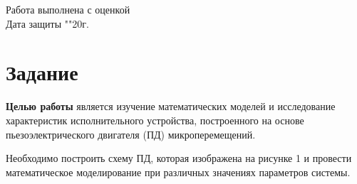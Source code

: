 \documentclass[a4paper, 12pt]{article}
\begin{document}
\begin{titlepage}
	Работа выполнена с оценкой \hspace{1cm} \underline{\hspace{8cm}} \\ 
	\vspace{1cm}
	Дата защиты "\underline{\hspace{0.7cm}}"\hspace{0.2cm}\underline{\hspace{2cm}}\hspace{0.2cm}20\underline{\hspace{0.7cm}}г.
	
\end{titlepage}	


\section*{\centering Задание}
\textbf{Целью работы} является изучение математических моделей и исследование характеристик исполнительного устройства, построенного на основе пьезоэлектрического двигателя (ПД) микроперемещений. \par
Необходимо построить схему ПД, которая изображена на рисунке 1 и провести математическое моделирование при различных значениях параметров системы.
\end{document}
